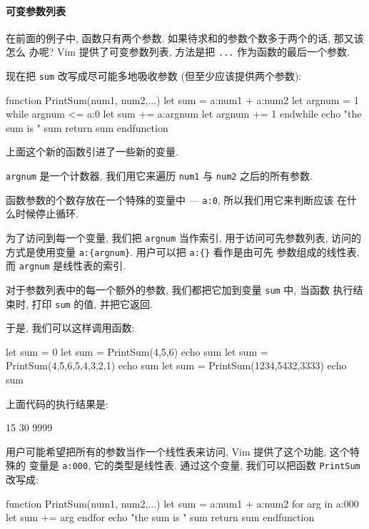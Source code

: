 \paragraph{可变参数列表}
\label{para:variable_argument_list}

在前面的例子中, 函数只有两个参数. 如果待求和的参数个数多于两个的话, 那又该怎么
办呢? Vim 提供了可变参数列表, 方法是把 \texttt{...} 作为函数的最后一个参数.

现在把 \texttt{sum} 改写成尽可能多地吸收参数 (但至少应该提供两个参数):
\begin{vimcode}
function PrintSum(num1, num2,...)
    let sum = a:num1 + a:num2
    let argnum = 1
    while argnum <= a:0
        let sum += a:{argnum}
        let argnum += 1
    endwhile
    echo "the sum is " sum
    return sum
endfunction
\end{vimcode}
上面这个新的函数引进了一些新的变量.

\texttt{argnum} 是一个计数器, 我们用它来遍历 \texttt{num1} 与 \texttt{num2}
之后的所有参数.

函数参数的个数存放在一个特殊的变量中 --- \texttt{a:0}, 所以我们用它来判断应该
在什么时候停止循环.

为了访问到每一个变量, 我们把 \texttt{argnum} 当作索引, 用于访问可先参数列表,
访问的方式是使用变量 \verb'a:{argnum}'. 用户可以把 \verb'a:{}' 看作是由可先
参数组成的线性表, 而 \texttt{argnum} 是线性表的索引.

对于参数列表中的每一个额外的参数, 我们都把它加到变量 \texttt{sum} 中, 当函数
执行结束时, 打印 \texttt{sum} 的值, 并把它返回.

于是, 我们可以这样调用函数:
\begin{vimcode}
let sum = 0
let sum = PrintSum(4,5,6)
echo sum
let sum = PrintSum(4,5,6,5,4,3,2,1)
echo sum
let sum = PrintSum(1234,5432,3333)
echo sum
\end{vimcode}
上面代码的执行结果是:
\begin{vimcode}
15
30
9999
\end{vimcode}

用户可能希望把所有的参数当作一个线性表来访问, Vim 提供了这个功能, 这个特殊的
变量是 \texttt{a:000}, 它的类型是线性表. 通过这个变量, 我们可以把函数
\texttt{PrintSum} 改写成:
\begin{vimcode}
function PrintSum(num1, num2,...)
    let sum = a:num1 + a:num2
    for arg in a:000
        let sum += arg
    endfor
    echo "the sum is " sum
    return sum
endfunction
\end{vimcode}
